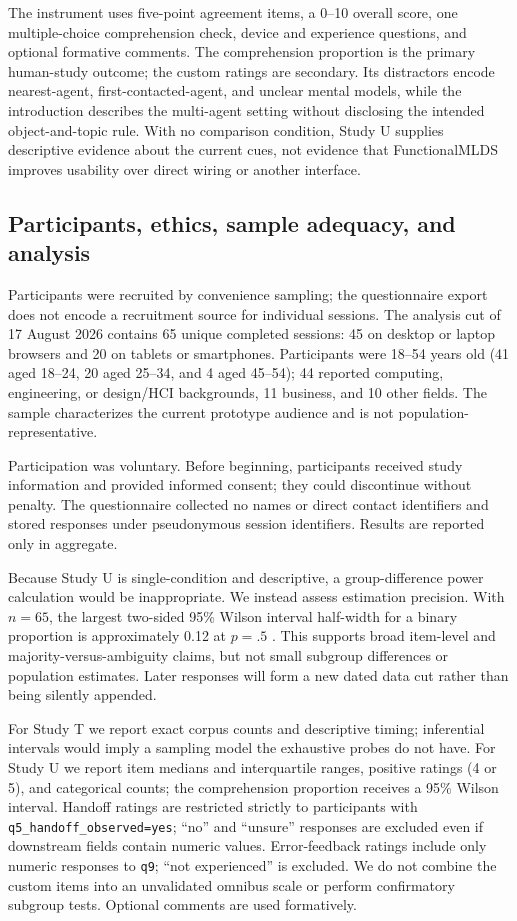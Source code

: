 The instrument uses five-point agreement items, a 0--10 overall score, one
multiple-choice comprehension check, device and experience questions, and
optional formative comments.  The comprehension proportion is the primary
human-study outcome; the custom ratings are secondary.  Its distractors encode
nearest-agent, first-contacted-agent, and unclear mental models, while the
introduction describes the multi-agent setting without disclosing the intended
object-and-topic rule.  With no comparison condition, Study U supplies
descriptive evidence about the current cues, not evidence that FunctionalMLDS
improves usability over direct wiring or another interface.

\subsection{Participants, ethics, sample adequacy, and analysis}

Participants were recruited by convenience sampling; the questionnaire export
does not encode a recruitment source for individual sessions.  The analysis cut
of 17 August 2026 contains 65 unique completed sessions: 45 on desktop or
laptop browsers and 20 on tablets or smartphones.  Participants were 18--54
years old (41 aged 18--24, 20 aged 25--34, and 4 aged 45--54); 44 reported
computing, engineering, or design/HCI backgrounds, 11 business, and 10 other
fields.  The sample characterizes the current prototype audience and is not
population-representative.

Participation was voluntary.  Before beginning, participants received study
information and provided informed consent; they could discontinue without
penalty.  The questionnaire collected no names or direct contact identifiers
and stored responses under pseudonymous session identifiers.  Results are
reported only in aggregate.

Because Study U is single-condition and descriptive, a group-difference power
calculation would be inappropriate.  We instead assess estimation precision.
With \(n=65\), the largest two-sided 95\% Wilson interval half-width for a binary
proportion is approximately 0.12 at \(p=.5\) \cite{wilson1927probable}.  This
supports broad item-level and majority-versus-ambiguity claims, but not small
subgroup differences or population estimates.  Later responses will form a new
dated data cut rather than being silently appended.

For Study T we report exact corpus counts and descriptive timing; inferential
intervals would imply a sampling model the exhaustive probes do not have.  For
Study U we report item medians and interquartile ranges, positive ratings (4 or
5), and categorical counts; the comprehension proportion receives a 95\%
Wilson interval.  Handoff ratings are restricted strictly to participants with
\texttt{q5\_handoff\_observed=yes}; ``no'' and ``unsure'' responses are excluded
even if downstream fields contain numeric values.  Error-feedback ratings
include only numeric responses to \texttt{q9}; ``not experienced'' is excluded.
We do not combine the custom items into an unvalidated omnibus scale or perform
confirmatory subgroup tests.  Optional comments are used formatively.

